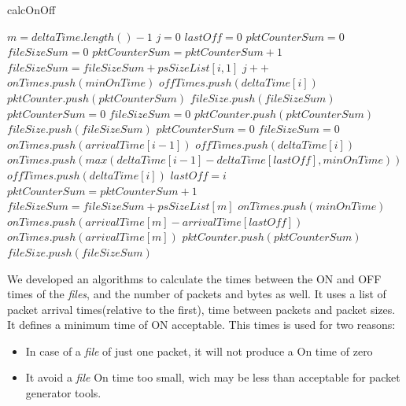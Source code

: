 	
\begin{algorithm}[ht!]
	\caption{calcOnOff}
	\label{alg:calcOnOff}
	\begin{algorithmic}[1]
		\small
		\State $m = deltaTime.length() - 1$
		\State $j = 0$
		\State $lastOff = 0$
		\State $pktCounterSum = 0$
		\State $fileSizeSum = 0$
		\State $pktCounterSum = pktCounterSum + 1$
		\State $fileSizeSum = fileSizeSum + psSizeList[i, 1]$
		 
		\State $j++$
		\State $onTimes.push(minOnTime)$
		\State $offTimes.push(deltaTime[i])$
		\State $pktCounter.push(pktCounterSum)$
		\State $fileSize.push(fileSizeSum)$
		\State $pktCounterSum = 0$
		\State $fileSizeSum = 0$
		\Else {} 
		\State $pktCounter.push(pktCounterSum)$
		\State $fileSize.push(fileSizeSum)$
		\State $pktCounterSum = 0$
		\State $fileSizeSum = 0$
		\State $onTimes.push(arrivalTime[i - 1])$
		\State $offTimes.push(deltaTime[i])$
		\Else {} 
		\State  $onTimes.push(max(deltaTime[i-1] - deltaTime[lastOff], minOnTime))$ 
		\State  $offTimes.push(deltaTime[i])$
		\EndIf
		\State $lastOff = i$
		\EndIf 
		\EndIf       
		\EndFor
		\State $pktCounterSum = pktCounterSum + 1$
		\State $fileSizeSum = fileSizeSum + psSizeList[m]$
		 
		\State $onTimes.push(minOnTime)$ %
		\Else {}
		\State $onTimes.push(arrivalTime[m] - arrivalTime[lastOff])$ 
		\Else 
		\State $onTimes.push(arrivalTime[m])$ 
		\EndIf
		\EndIf
		\State $pktCounter.push(pktCounterSum)$
		\State $fileSize.push(fileSizeSum)$
		\EndFunction
	\end{algorithmic}
\end{algorithm}


We developed an algorithms to calculate the times between the ON and OFF times of the \textit{files}, and the number of packets and bytes as well. It uses a list of packet arrival times(relative to the first), time between packets and packet sizes. It defines a minimum time of ON acceptable. This times is used for two reasons:

\begin{itemize}
\item In case of a \textit{file} of just one packet, it will not produce a On time of zero
\item It avoid a \textit{file} On time too small, wich may be less than acceptable for packet generator tools.
\end{itemize}

